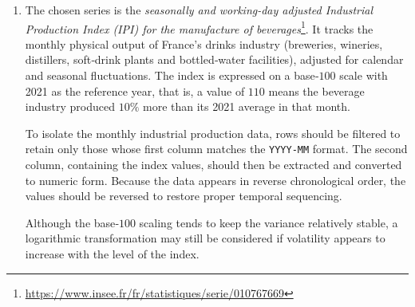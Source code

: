 \documentclass[12pt]{article}
\begin{document}
    \begin{enumerate}
        \item The chosen series is the \emph{seasonally and working-day adjusted Industrial Production Index (IPI) for the manufacture of beverages}\footnote{\url{https://www.insee.fr/fr/statistiques/serie/010767669}}. It tracks the monthly physical output of France’s drinks industry (breweries, wineries, distillers, soft‑drink plants and bottled‑water facilities), adjusted for calendar and seasonal fluctuations. The index is expressed on a base‑$100$ scale with 2021 as the reference year, that is, a value of $110$ means the beverage industry produced $10 \%$ more than its 2021 average in that month.

        To isolate the monthly industrial production data, rows should be filtered to retain only those whose first column matches the \texttt{YYYY-MM} format. The second column, containing the index values, should then be extracted and converted to numeric form. Because the data appears in reverse chronological order, the values should be reversed to restore proper temporal sequencing.

        Although the base‑$100$ scaling tends to keep the variance relatively stable, a logarithmic transformation may still be considered if volatility appears to increase with the level of the index.


\end{enumerate}
\end{document}
